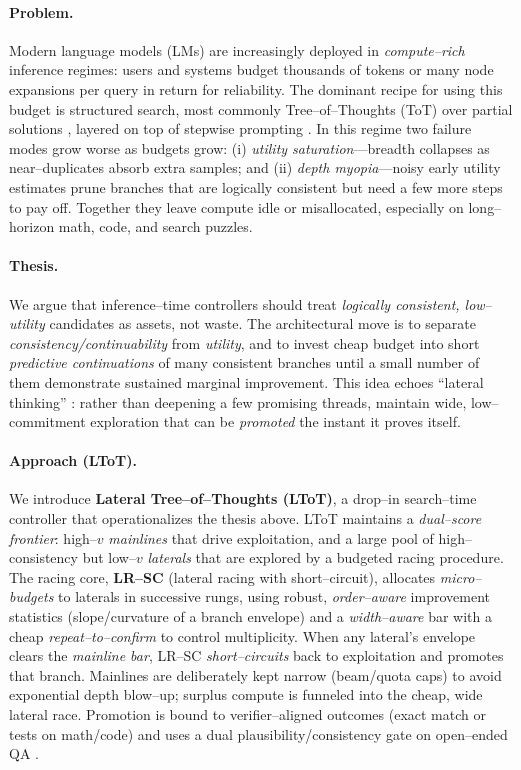 \documentclass{article}
\begin{document}
\paragraph{Problem.}
Modern language models (LMs) are increasingly deployed in \emph{compute--rich} inference regimes: users and systems budget thousands of tokens or many node expansions per query in return for reliability.
The dominant recipe for using this budget is structured search, most commonly Tree--of--Thoughts (ToT) over partial solutions \citep{yao2023tot}, layered on top of stepwise prompting \citep{wei2022cot,wang2022selfconsistency,kojima2022zeroshotcot}.
In this regime two failure modes grow worse as budgets grow:
(i) \emph{utility saturation}—breadth collapses as near--duplicates absorb extra samples; and
(ii) \emph{depth myopia}—noisy early utility estimates prune branches that are logically consistent but need a few more steps to pay off.
Together they leave compute idle or misallocated, especially on long--horizon math, code, and search puzzles.

\paragraph{Thesis.}
We argue that inference--time controllers should treat \emph{logically consistent, low--utility} candidates as assets, not waste.
The architectural move is to separate \emph{consistency/continuability} from \emph{utility}, and to invest cheap budget into short \emph{predictive continuations} of many consistent branches until a small number of them demonstrate sustained marginal improvement.
This idea echoes ``lateral thinking'' \citep{debono1967lateral}: rather than deepening a few promising threads, maintain wide, low--commitment exploration that can be \emph{promoted} the instant it proves itself.

\paragraph{Approach (LToT).}
We introduce \textbf{Lateral Tree--of--Thoughts (LToT)}, a drop--in search--time controller that operationalizes the thesis above.
LToT maintains a \emph{dual--score frontier}: high--$v$ \emph{mainlines} that drive exploitation, and a large pool of high--consistency but low--$v$ \emph{laterals} that are explored by a budgeted racing procedure.
The racing core, \textbf{LR--SC} (lateral racing with short--circuit), allocates \emph{micro--budgets} to laterals in successive rungs, using robust, \emph{order--aware} improvement statistics (slope/curvature of a branch envelope) and a \emph{width--aware} bar with a cheap \emph{repeat--to--confirm} to control multiplicity.
When any lateral's envelope clears the \emph{mainline bar}, LR--SC \emph{short--circuits} back to exploitation and promotes that branch.
Mainlines are deliberately kept narrow (beam/quota caps) to avoid exponential depth blow--up; surplus compute is funneled into the cheap, wide lateral race.
Promotion is bound to verifier--aligned outcomes (exact match or tests on math/code) and uses a dual plausibility/consistency gate on open--ended QA \citep{cobbe2021verifiers}.
\end{document}
